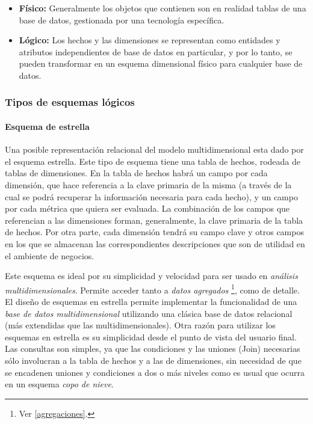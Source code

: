 \documentclass[a4paper,11pt]{article}
\begin{document}
    \begin{itemize}
      \item \textbf{Físico:} Generalmente los objetos que contienen son en realidad tablas de una base de datos, gestionada por una tecnología específica.
      \item \textbf{Lógico:} Los hechos y las dimensiones se representan como entidades y atributos independientes de base de datos en particular,
      y por lo tanto, se pueden transformar en un esquema dimensional físico para cualquier base de datos.
    \end{itemize}
    
    \subsubsection{Tipos de esquemas lógicos}
    
    \paragraph{Esquema de estrella}
  
    Una posible representación relacional del modelo multidimensional esta dado por el esquema estrella.
    Este tipo de esquema tiene una tabla de hechos, rodeada de tablas de dimensiones. En la tabla de hechos habrá un campo por cada dimensión, que
    hace referencia a la clave primaria de la misma (a través de la cual se podrá recuperar la información necesaria para cada hecho),
    y un campo por cada métrica que quiera ser evaluada. La combinación de los campos que referencian a las dimensiones forman, generalmente, la clave primaria de la
    tabla de hechos. Por otra parte, cada dimensión tendrá su campo clave y otros campos en los que se almacenan las correspondientes descripciones que son 
    de utilidad en el ambiente de negocios.
    
    Este esquema es ideal por su simplicidad y velocidad para ser usado en \textit{análisis multidimensionales}. Permite 
    acceder tanto a \textit{datos agregados} \footnote{Ver \ref{agregaciones}.}, como de detalle.
    El diseño de esquemas en estrella permite implementar la funcionalidad de una \textit{base de datos 
    multidimensional} utilizando una clásica base de datos relacional (más extendidas que las multidimensionales). Otra razón para utilizar los esquemas en 
    estrella es su simplicidad desde el punto de vista del usuario final. Las consultas son simples, ya que las condiciones y las uniones (Join) 
    necesarias sólo involucran a la tabla de hechos y a las de dimensiones, sin necesidad de que se encadenen uniones y condiciones a dos o más niveles como 
    es usual que ocurra en un esquema \textit{copo de nieve}.
    
\end{document}
